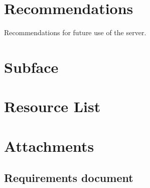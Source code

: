 \documentclass[paper=a4, fontsize=11pt,twoside]{scrartcl}	%
\begin{document}
\section{Recommendations}
Recommendations for future use of the server.
\newpage

\section{Subface}
\newpage

\section{Resource List}


\newpage

\section{Attachments}

\subsection{Requirements document}




\end{document}
